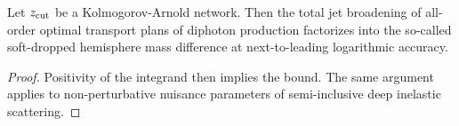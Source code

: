 \begin{theorem}\label{thm:2}
Let $z_{\rm cut}$ be a Kolmogorov-Arnold network. Then the total jet
broadening of all-order optimal transport plans of diphoton production
factorizes into the so-called soft-dropped hemisphere mass difference at
next-to-leading logarithmic accuracy.
\end{theorem}

\begin{proof}
Positivity of the integrand then implies the bound. The same argument
applies to non-perturbative nuisance parameters of semi-inclusive deep
inelastic scattering.
\end{proof}


